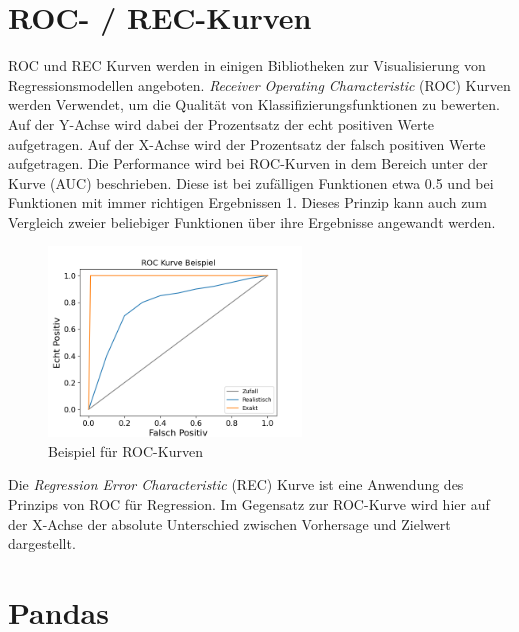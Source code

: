 \section{ROC- / REC-Kurven}
\label{sec:roc_rec}

ROC und REC Kurven werden in einigen Bibliotheken zur Visualisierung von Regressionsmodellen angeboten. \emph{Receiver Operating Characteristic} (ROC) Kurven werden Verwendet, um die Qualität von Klassifizierungsfunktionen zu bewerten. Auf der Y-Achse wird dabei der Prozentsatz der echt positiven Werte aufgetragen. Auf der X-Achse wird der Prozentsatz der falsch positiven Werte aufgetragen. Die Performance wird bei ROC-Kurven in dem Bereich unter der Kurve (AUC) beschrieben. Diese ist bei zufälligen Funktionen etwa 0.5 und bei Funktionen mit immer richtigen Ergebnissen 1. Dieses Prinzip kann auch zum Vergleich zweier beliebiger Funktionen über ihre Ergebnisse angewandt werden.

\begin{figure}
\vspace{-1cm}
\includegraphics[width=0.6\textwidth]{images/roc_example.png}
\caption{Beispiel für ROC-Kurven}
\label{fig:roc_example}
\vspace{-4cm}
\end{figure}

\noindent Die \emph{Regression Error Characteristic} (REC) Kurve ist eine Anwendung des Prinzips von ROC für Regression. Im Gegensatz zur ROC-Kurve wird hier auf der X-Achse der absolute Unterschied zwischen Vorhersage und Zielwert dargestellt.\linebreak \parencite{RocRec}

\vspace{3.5cm}

\pagebreak

\section{Pandas}
\label{sec:pandas}

